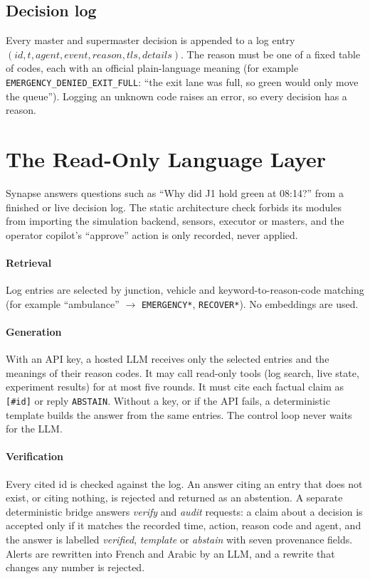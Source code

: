 \documentclass[conference]{IEEEtran}
\begin{document}
\subsection{Decision log}
Every master and supermaster decision is appended to a log entry
$(\textit{id}, t, \textit{agent}, \textit{event}, \textit{reason}, \textit{tls}, \textit{details})$.
The reason must be one of a fixed table of codes, each with an official plain-language
meaning (for example \texttt{EMERGENCY\_DENIED\_EXIT\_FULL}: ``the exit lane was full, so
green would only move the queue''). Logging an unknown code raises an error, so every
decision has a reason.

\section{The Read-Only Language Layer}\label{sec:synapse}

Synapse answers questions such as ``Why did J1 hold green at 08:14?'' from a finished or
live decision log. The static architecture check forbids its modules from importing the
simulation backend, sensors, executor or masters, and the operator copilot's
``approve'' action is only recorded, never applied.

\paragraph{Retrieval} Log entries are selected by junction, vehicle and keyword-to-reason-code
matching (for example ``ambulance'' $\rightarrow$ \texttt{EMERGENCY*}, \texttt{RECOVER*}).
No embeddings are used.

\paragraph{Generation} With an API key, a hosted LLM receives only the selected entries and
the meanings of their reason codes. It may call read-only tools (log search, live state,
experiment results) for at most five rounds. It must cite each factual claim as
\texttt{[\#id]} or reply \texttt{ABSTAIN}. Without a key, or if the API fails, a
deterministic template builds the answer from the same entries. The control loop never
waits for the LLM.

\paragraph{Verification} Every cited id is checked against the log. An answer citing an
entry that does not exist, or citing nothing, is rejected and returned as an abstention.
A separate deterministic bridge answers \emph{verify} and \emph{audit} requests: a claim
about a decision is accepted only if it matches the recorded time, action, reason code and
agent, and the answer is labelled \emph{verified}, \emph{template} or \emph{abstain} with
seven provenance fields. Alerts are rewritten into French and Arabic by an LLM, and a
rewrite that changes any number is rejected.
\end{document}
